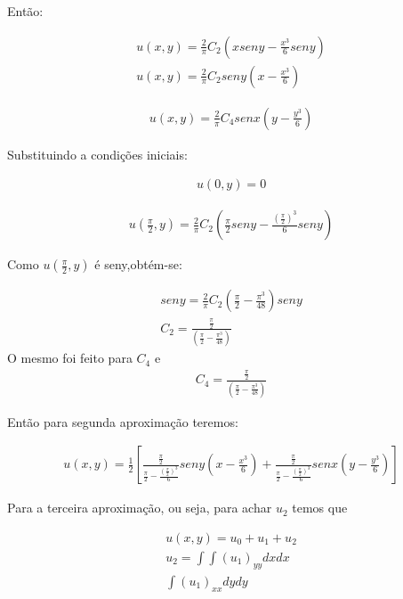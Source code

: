 Então:

\begin{gather}
u(x,y) = \frac{2}{\pi}C_{2}\left(xseny - \frac{x^3}{6}seny\right)\nonumber\\
u(x,y) = \frac{2}{\pi}C_{2}seny\left(x - \frac{x^3}{6}\right)
\end{gather}

\begin{gather}
u(x,y) = \frac{2}{\pi}C_{4}senx\left(y - \frac{y^3}{6}\right)
\end{gather}

Substituindo a  condições iniciais:

\begin{gather}
u(0,y) = 0
\end{gather}

\begin{gather}
u\left(\frac{\pi}{2},y\right) = \frac{2}{\pi}C_{2}\left(\frac{\pi}{2}seny - \frac{(\frac{\pi}{2})^3}{6}seny\right)
\end{gather}

Como $u\left(\frac{\pi}{2},y\right)$ é seny,obtém-se:

\begin{gather}
seny = \frac{2}{\pi}C_{2}\left(\frac{\pi}{2} - \frac{\pi^3}{48}\right)seny\nonumber\\
C_{2} = \frac{\frac{\pi}{2}}{\left(\frac{\pi}{2}-\frac{\pi^3}{48}\right)}
\end{gather}
O mesmo foi feito para $C_{4}$ e
\begin{gather}
C_{4} = \frac{\frac{\pi}{2}}{\left(\frac{\pi}{2}-\frac{\pi^3}{48}\right)}
\end{gather}

Então para segunda aproximação teremos:

\begin{gather}
u(x,y) = \frac{1}{2}\left[ \frac{\frac{\pi}{2}}{\frac{\pi}{2} - \frac{(\frac{\pi}{2})^3}{6}} seny\left(x - \frac{x^3}{6}\right) + \frac{\frac{\pi}{2}}{\frac{\pi}{2} - \frac{(\frac{\pi}{2})^3}{6}} senx\left(y - \frac{y^3}{6}\right)\right]
\end{gather}

Para a terceira aproximação, ou seja, para achar $u_{2}$ temos que

\begin{gather}
u(x,y) = u_{0} + u_{1} + u_{2}\nonumber\\
u_{2} = \int \int(u_{1})_{yy}dxdx\nonumber\\
\int(u_{1})_{xx}dydy\nonumber\\
\end{gather}


